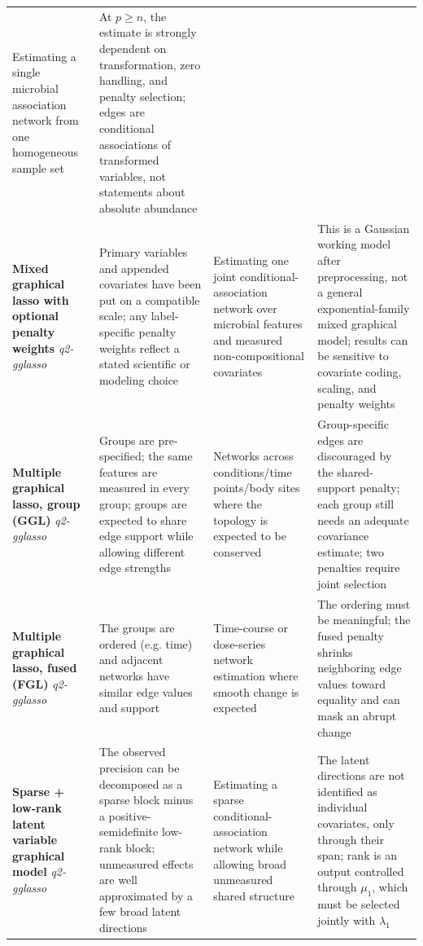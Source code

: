 \documentclass[11pt,a4paper]{article}
\begin{document}
\begin{landscape}
\begin{small}
\begin{longtable}{@{}p{3.2cm}p{6.2cm}p{4.6cm}p{6.4cm}@{}}
Estimating a single microbial association network from one homogeneous sample set &
At $p\ge n$, the estimate is strongly dependent on transformation, zero handling, and penalty selection; edges are conditional associations of transformed variables, not statements about absolute abundance \\
\addlinespace
\textbf{Mixed graphical lasso with optional penalty weights} \newline \textit{q2-gglasso} &
Primary variables and appended covariates have been put on a compatible scale; any label-specific penalty weights reflect a stated scientific or modeling choice &
Estimating one joint conditional-association network over microbial features and measured non-compositional covariates &
This is a Gaussian working model after preprocessing, not a general exponential-family mixed graphical model; results can be sensitive to covariate coding, scaling, and penalty weights \\
\addlinespace
\textbf{Multiple graphical lasso, group (GGL)} \newline \textit{q2-gglasso} &
Groups are pre-specified; the same features are measured in every group; groups are expected to share edge support while allowing different edge strengths &
Networks across conditions/time points/body sites where the topology is expected to be conserved &
Group-specific edges are discouraged by the shared-support penalty; each group still needs an adequate covariance estimate; two penalties require joint selection \\
\addlinespace
\textbf{Multiple graphical lasso, fused (FGL)} \newline \textit{q2-gglasso} &
The groups are ordered (e.g. time) and adjacent networks have similar edge values and support &
Time-course or dose-series network estimation where smooth change is expected &
The ordering must be meaningful; the fused penalty shrinks neighboring edge values toward equality and can mask an abrupt change \\
\addlinespace
\textbf{Sparse + low-rank latent variable graphical model} \newline \textit{q2-gglasso} &
The observed precision can be decomposed as a sparse block minus a positive-semidefinite low-rank block; unmeasured effects are well approximated by a few broad latent directions &
Estimating a sparse conditional-association network while allowing broad unmeasured shared structure &
The latent directions are not identified as individual covariates, only through their span; rank is an output controlled through $\mu_1$, which must be selected jointly with $\lambda_1$ \\

\end{longtable}
\end{small}
\end{landscape}
\end{document}
